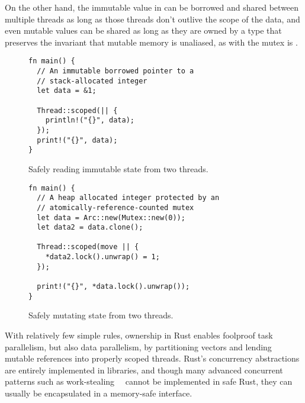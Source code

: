 On the other hand, the immutable value in  can be borrowed and shared between multiple threads as long as those threads don't outlive the scope of the data, and even mutable values can be shared as long
as they are owned by a type that preserves the invariant that mutable memory is unaliased, as with the
mutex is .

\begin{figure}
\begin{lstlisting}
fn main() {
  // An immutable borrowed pointer to a
  // stack-allocated integer
  let data = &1;

  Thread::scoped(|| {
    println!("{}", data);
  });
  print!("{}", data);
}
\end{lstlisting}
  \caption{Safely reading immutable state from two threads.}
  \label{fig:shared-concurrency}
\end{figure}

\begin{figure}
\begin{lstlisting}
fn main() {
  // A heap allocated integer protected by an
  // atomically-reference-counted mutex
  let data = Arc::new(Mutex::new(0));
  let data2 = data.clone();

  Thread::scoped(move || {
    *data2.lock().unwrap() = 1;
  });

  print!("{}", *data.lock().unwrap());
}
\end{lstlisting}
  \caption{Safely mutating state from two threads.}
  \label{fig:shared-mutable-concurrency}
\end{figure}

With relatively few simple rules, ownership in Rust enables foolproof task parallelism,
but also data parallelism, by partitioning vectors and lending mutable references into properly scoped threads.
Rust's concurrency abstractions are entirely implemented in libraries, and though
many advanced concurrent patterns such as work-stealing~~\cite{blumeofe:multiprogrammed-work-stealing}
cannot be implemented in safe Rust, they can usually be encapsulated in a memory-safe interface.

